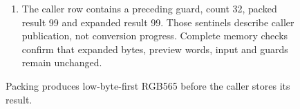 \begin{figure}[htbp]
\begin{minipage}{\linewidth}
\begin{enumerate}
      \item The caller row contains a preceding guard, count 32, packed result 99 and expanded result 99. Those sentinels describe caller publication, not conversion progress. Complete memory checks confirm that expanded bytes, preview words, input and guards remain unchanged.
    \end{enumerate}
  \end{minipage}
  \caption{Packing produces low-byte-first RGB565 before the caller stores its result.}
  \label{capture:019-rgb-formats-f01}
  \label{rgb-f01}
\end{figure}
\par
